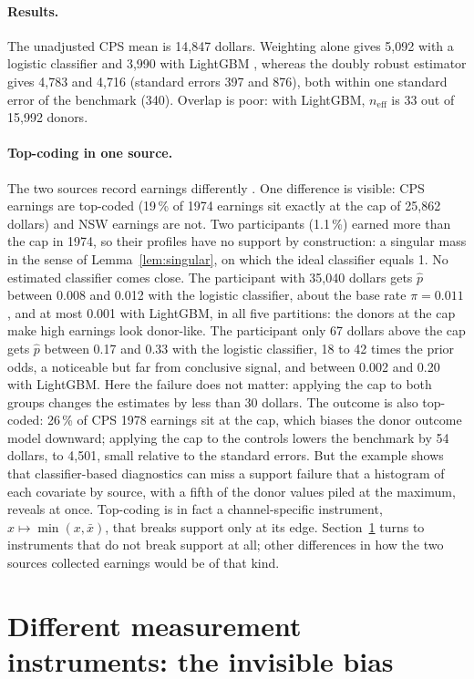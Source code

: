\documentclass[11pt,a4paper]{article}
\newcommand{\neff}{n_{\mathrm{eff}}}
\theoremstyle{plain}
\theoremstyle{definition}
\begin{document}
\paragraph{Results.} The unadjusted CPS mean is 14{,}847 dollars. Weighting alone gives 5{,}092 with a logistic classifier and 3{,}990 with LightGBM \citep{ke2017}, whereas the doubly robust estimator gives 4{,}783 and 4{,}716 (standard errors 397 and 876), both within one standard error of the benchmark (340). Overlap is poor: with LightGBM, $\neff$ is 33 out of 15{,}992 donors.

\paragraph{Top-coding in one source.} The two sources record earnings differently \citep{smith2005}. One difference is visible: CPS earnings are top-coded (19\,\% of 1974 earnings sit exactly at the cap of 25{,}862 dollars) and NSW earnings are not. Two participants (1.1\,\%) earned more than the cap in 1974, so their profiles have no support by construction: a singular mass in the sense of Lemma~\ref{lem:singular}, on which the ideal classifier equals 1. No estimated classifier comes close. The participant with 35{,}040 dollars gets $\hat p$ between 0.008 and 0.012 with the logistic classifier, about the base rate $\pi=0.011$, and at most 0.001 with LightGBM, in all five partitions: the donors at the cap make high earnings look donor-like. The participant only 67 dollars above the cap gets $\hat p$ between 0.17 and 0.33 with the logistic classifier, 18 to 42 times the prior odds, a noticeable but far from conclusive signal, and between 0.002 and 0.20 with LightGBM. Here the failure does not matter: applying the cap to both groups changes the estimates by less than 30 dollars. The outcome is also top-coded: 26\,\% of CPS 1978 earnings sit at the cap, which biases the donor outcome model downward; applying the cap to the controls lowers the benchmark by 54 dollars, to 4{,}501, small relative to the standard errors. But the example shows that classifier-based diagnostics can miss a support failure that a histogram of each covariate by source, with a fifth of the donor values piled at the maximum, reveals at once. Top-coding is in fact a channel-specific instrument, $x\mapsto\min(x,\bar x)$, that breaks support only at its edge. Section~\ref{sec:instruments} turns to instruments that do not break support at all; other differences in how the two sources collected earnings would be of that kind.
\section{Different measurement instruments: the invisible bias}\label{sec:instruments}
\end{document}
